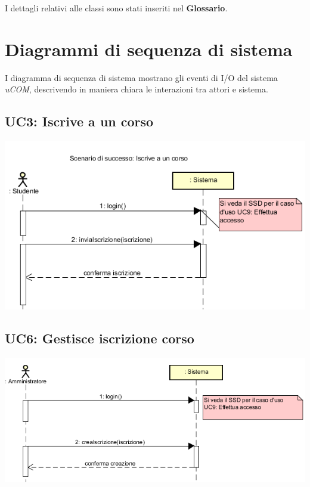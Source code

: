 \documentclass[12pt]{report}
\begin{document}
	I dettagli relativi alle classi sono stati inseriti nel \textbf{Glossario}.
	
	\newpage
	
	\section{Diagrammi di sequenza di sistema}
	
	I diagramma di sequenza di sistema mostrano gli eventi di I/O del sistema \textit{uCOM}, descrivendo in maniera chiara le interazioni tra attori e sistema.
	
	\subsection{UC3: Iscrive a un corso}
	\begin{center}
		\includegraphics{./images/SSD_UC3.png}
	\end{center}
	
		
	\subsection{UC6: Gestisce iscrizione corso}
	
	\begin{center}
		\includegraphics{./images/SSD_UC6.png}
	\end{center}
	
	
\end{document}
